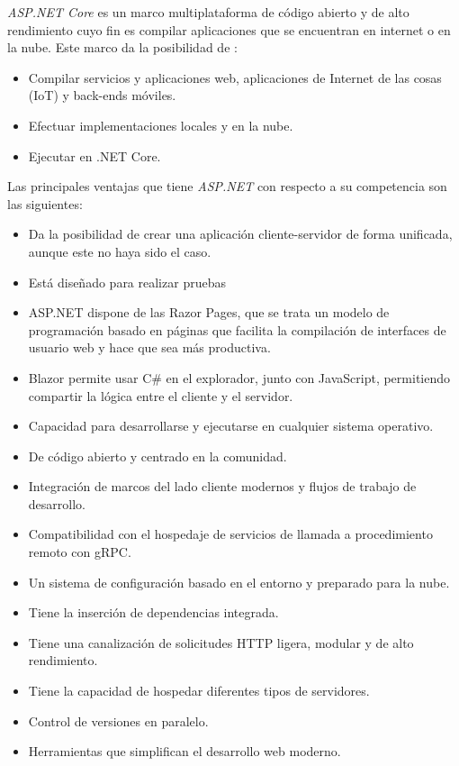 \cite{ASP.NET}
\textit{ASP.NET Core} es un marco multiplataforma de
    código abierto y de alto rendimiento cuyo fin es compilar aplicaciones que
    se encuentran en internet o en la nube. Este marco da la posibilidad de :
    \begin{itemize}
        \item Compilar servicios y aplicaciones web, aplicaciones de Internet de las cosas (IoT) y back-ends móviles.
        \item Efectuar implementaciones locales y en la nube.
        \item Ejecutar en .NET Core.
    \end{itemize}

    Las principales ventajas que tiene \textit{ASP.NET} con respecto a su competencia son las siguientes:
    \begin{itemize}
        \item Da la posibilidad de crear una aplicación cliente-servidor de forma unificada, aunque este no haya sido el caso.
        \item Está diseñado para realizar pruebas
        \item ASP.NET dispone de las Razor Pages, que se trata un modelo de programación
        basado en páginas que facilita la compilación de interfaces de usuario
        web y hace que sea más productiva.
        \item Blazor permite usar C\# en el explorador, junto con JavaScript, permitiendo compartir la lógica entre el cliente y el servidor.
        \item Capacidad para desarrollarse y ejecutarse en cualquier sistema operativo.
        \item De código abierto y centrado en la comunidad.
        \item Integración de marcos del lado cliente modernos y flujos de trabajo de desarrollo.
        \item Compatibilidad con el hospedaje de servicios de llamada a procedimiento remoto con gRPC.
        \item Un sistema de configuración basado en el entorno y preparado para la nube.
        \item Tiene la inserción de dependencias integrada.
        \item Tiene una canalización de solicitudes HTTP ligera, modular y de alto rendimiento.
        \item Tiene la capacidad de hospedar diferentes tipos de servidores.
        \item Control de versiones en paralelo.
        \item Herramientas que simplifican el desarrollo web moderno.
    \end{itemize}


